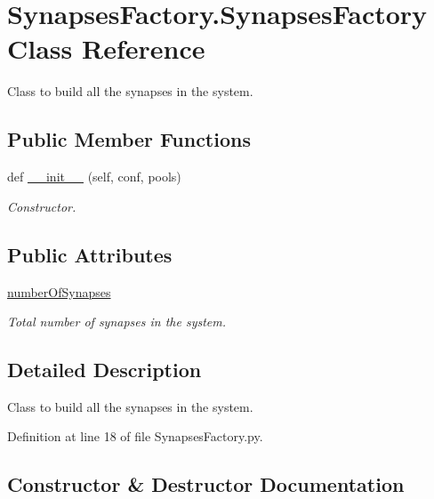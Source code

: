 \hypertarget{class_synapses_factory_1_1_synapses_factory}{}\section{Synapses\+Factory.\+Synapses\+Factory Class Reference}
\label{class_synapses_factory_1_1_synapses_factory}


Class to build all the synapses in the system.  


\subsection*{Public Member Functions}
\begin{DoxyCompactItemize}
\item 
def \hyperlink{class_synapses_factory_1_1_synapses_factory_a4de86ef35a3945787df975afe33733fe}{\+\_\+\+\_\+init\+\_\+\+\_\+} (self, conf, pools)
\begin{DoxyCompactList}\small\item\em Constructor. \end{DoxyCompactList}\end{DoxyCompactItemize}
\subsection*{Public Attributes}
\begin{DoxyCompactItemize}
\item 
\hyperlink{class_synapses_factory_1_1_synapses_factory_af83fbc27851417b677391ece9bf49a29}{number\+Of\+Synapses}
\begin{DoxyCompactList}\small\item\em Total number of synapses in the system. \end{DoxyCompactList}\end{DoxyCompactItemize}


\subsection{Detailed Description}
Class to build all the synapses in the system. 

Definition at line 18 of file Synapses\+Factory.\+py.



\subsection{Constructor \& Destructor Documentation}
